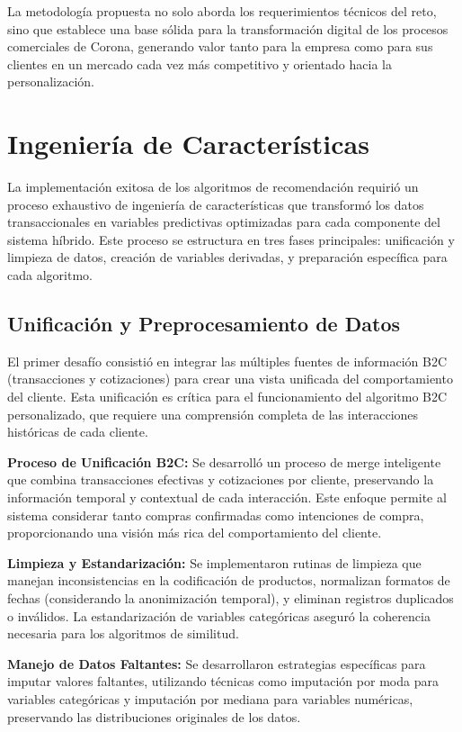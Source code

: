 \documentclass[twocolumn]{article}
\begin{document}
La metodología propuesta no solo aborda los requerimientos técnicos del reto, sino que establece una base sólida para la transformación digital de los procesos comerciales de Corona, generando valor tanto para la empresa como para sus clientes en un mercado cada vez más competitivo y orientado hacia la personalización.

\section{Ingeniería de Características}

La implementación exitosa de los algoritmos de recomendación requirió un proceso exhaustivo de ingeniería de características que transformó los datos transaccionales en variables predictivas optimizadas para cada componente del sistema híbrido. Este proceso se estructura en tres fases principales: unificación y limpieza de datos, creación de variables derivadas, y preparación específica para cada algoritmo.

\subsection{Unificación y Preprocesamiento de Datos}

El primer desafío consistió en integrar las múltiples fuentes de información B2C (transacciones y cotizaciones) para crear una vista unificada del comportamiento del cliente. Esta unificación es crítica para el funcionamiento del algoritmo B2C personalizado, que requiere una comprensión completa de las interacciones históricas de cada cliente.

\textbf{Proceso de Unificación B2C:} Se desarrolló un proceso de merge inteligente que combina transacciones efectivas y cotizaciones por cliente, preservando la información temporal y contextual de cada interacción. Este enfoque permite al sistema considerar tanto compras confirmadas como intenciones de compra, proporcionando una visión más rica del comportamiento del cliente.

\textbf{Limpieza y Estandarización:} Se implementaron rutinas de limpieza que manejan inconsistencias en la codificación de productos, normalizan formatos de fechas (considerando la anonimización temporal), y eliminan registros duplicados o inválidos. La estandarización de variables categóricas aseguró la coherencia necesaria para los algoritmos de similitud.

\textbf{Manejo de Datos Faltantes:} Se desarrollaron estrategias específicas para imputar valores faltantes, utilizando técnicas como imputación por moda para variables categóricas y imputación por mediana para variables numéricas, preservando las distribuciones originales de los datos.
\end{document}
